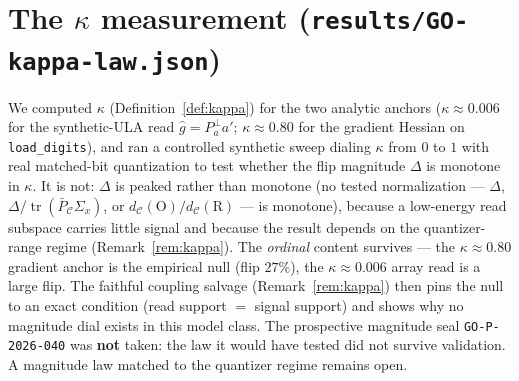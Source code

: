 \documentclass[11pt]{article}
\theoremstyle{remark}
\newcommand{\PCbar}{\bar P_{\mathcal{C}}}
\newcommand{\Sx}{\Sigma_{x}}
\newcommand{\tr}{\operatorname{tr}}
\newcommand{\kalign}{\kappa}
\newcommand{\seal}[1]{\texttt{GO-P-2026-#1}}
\begin{document}
\section{The $\kalign$ measurement (\texttt{results/GO-kappa-law.json})}\label{app:kappa}
We computed $\kalign$ (Definition~\ref{def:kappa}) for the two analytic anchors
($\kalign\approx0.006$ for the synthetic-ULA read $\hat g=P_a^\perp a'$;
$\kalign\approx0.80$ for the gradient Hessian on \texttt{load\_digits}), and ran a
controlled synthetic sweep dialing $\kalign$ from $0$ to $1$ with real matched-bit
quantization to test whether the flip magnitude $\Delta$ is monotone in $\kalign$. It is
not: $\Delta$ is peaked rather than monotone (no tested normalization ---
$\Delta$, $\Delta/\tr(\PCbar\Sx)$, or $d_{\mathcal C}(\mathrm O)/d_{\mathcal C}(\mathrm R)$
--- is monotone), because a low-energy read subspace carries little signal and because the
result depends on the quantizer-range regime (Remark~\ref{rem:kappa}). The
\emph{ordinal} content survives --- the $\kalign\approx0.80$ gradient anchor is the
empirical null (flip $27\%$), the $\kalign\approx0.006$ array read is a large flip. The
faithful coupling salvage (Remark~\ref{rem:kappa}) then pins the null to an exact
condition (read support $=$ signal support) and shows why no magnitude dial exists in this
model class. The prospective magnitude seal \seal{040} was \textbf{not} taken: the law it
would have tested did not survive validation. A magnitude law matched to the quantizer
regime remains open.
\end{document}
